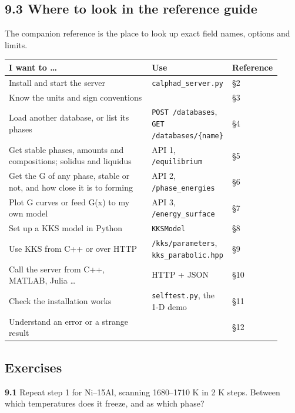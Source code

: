 \documentclass[12pt,a4paper]{article}
\begin{document}
\subsection*{9.3 Where to look in the reference guide}
The companion reference is the place to look up exact field names, options and limits.

\begingroup\small
\begin{longtable}{>{\raggedright\arraybackslash}p{0.522\linewidth}>{\raggedright\arraybackslash}p{0.264\linewidth}>{\raggedright\arraybackslash}p{0.134\linewidth}}
\toprule
\textbf{I want to \ldots{}} & \textbf{Use} & \textbf{Reference} \\
\midrule
\endhead
Install and start the server & \texttt{calphad\_\allowbreak{}server.\allowbreak{}py} & \S{}2 \\
Know the units and sign conventions &  & \S{}3 \\
Load another database, or list its phases & \texttt{POST /\allowbreak{}databases}, \texttt{GET /\allowbreak{}databases/\allowbreak{}\{name\}} & \S{}4 \\
Get stable phases, amounts and compositions; solidus and liquidus & API 1, \texttt{/\allowbreak{}equilibrium} & \S{}5 \\
Get the G of any phase, stable or not, and how close it is to forming & API 2, \texttt{/\allowbreak{}phase\_\allowbreak{}energies} & \S{}6 \\
Plot G curves or feed G(x) to my own model & API 3, \texttt{/\allowbreak{}energy\_\allowbreak{}surface} & \S{}7 \\
Set up a KKS model in Python & \texttt{KKSModel} & \S{}8 \\
Use KKS from C++ or over HTTP & \texttt{/\allowbreak{}kks/\allowbreak{}parameters}, \texttt{kks\_\allowbreak{}parabolic.\allowbreak{}hpp} & \S{}9 \\
Call the server from C++, MATLAB, Julia \ldots{} & HTTP + JSON & \S{}10 \\
Check the installation works & \texttt{selftest.\allowbreak{}py}, the 1-D demo & \S{}11 \\
Understand an error or a strange result &  & \S{}12 \\
\bottomrule
\end{longtable}
\endgroup

\subsection*{Exercises}
\textbf{9.1} Repeat step 1 for Ni--15Al, scanning 1680--1710 K in 2 K steps. Between which temperatures does it freeze, and as which phase?
\end{document}

